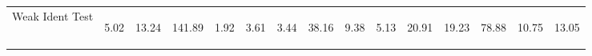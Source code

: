 \begin{center}
\begin{tabular}{lcccccccccccccc}
Weak Ident Test  & \begin{normalsize}5.02\end{normalsize} & \begin{normalsize}13.24\end{normalsize} & \begin{normalsize}141.89\end{normalsize} & \begin{normalsize}1.92\end{normalsize} & \begin{normalsize}3.61\end{normalsize} & \begin{normalsize}3.44\end{normalsize} & \begin{normalsize}38.16\end{normalsize} & \begin{normalsize}9.38\end{normalsize} & \begin{normalsize}5.13\end{normalsize} & \begin{normalsize}20.91\end{normalsize} & \begin{normalsize}19.23\end{normalsize} & \begin{normalsize}78.88\end{normalsize} & \begin{normalsize}10.75\end{normalsize} & \begin{normalsize}13.05\end{normalsize}\\

\end{tabular}
\end{center}
